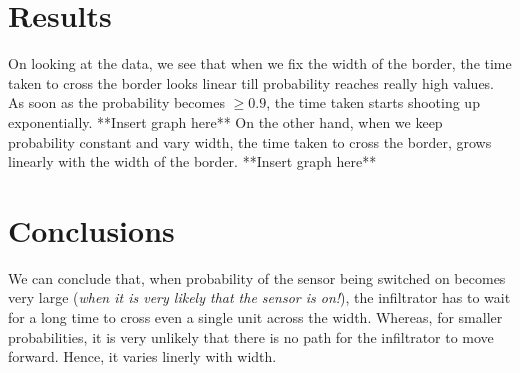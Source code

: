 \documentclass[12pt]{article}
\begin{document}
\section{Results}\label{results}
On looking at the data, we see that when we fix the width of the border, the time taken to cross the border looks linear till probability reaches really high values.
As soon as the probability becomes \(\geq 0.9\), the time taken starts shooting up exponentially.
\newline
**Insert graph here**
\newline
On the other hand, when we keep probability constant and vary width, the time taken to cross the border,
grows linearly with the width of the border.
\newline
**Insert graph here**

\section{Conclusions}\label{conclusions}
We can conclude that, when probability of the sensor being switched on becomes very large (\textit{when it is very likely that the sensor is on!}),
the infiltrator has to wait for a long time to cross even a single unit across the width. Whereas, for 
smaller probabilities, it is very unlikely that there is no path for the infiltrator to move forward.
Hence, it varies linerly with width.



\end{document}
